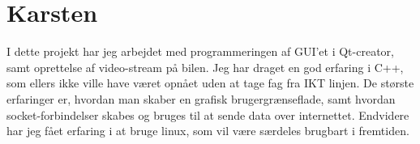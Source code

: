 \section{Karsten}
I dette projekt har jeg arbejdet med programmeringen af GUI'et i Qt-creator, samt oprettelse af video-stream på bilen. 
Jeg har draget en god erfaring i C++, som ellers ikke ville have været opnået uden at tage fag fra IKT linjen. 
De største erfaringer er, hvordan man skaber en grafisk brugergrænseflade, samt hvordan socket-forbindelser skabes og bruges til at sende data over internettet. 
Endvidere har jeg fået erfaring i at bruge linux, som vil være særdeles brugbart i fremtiden.  